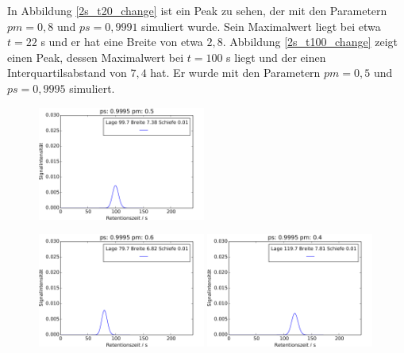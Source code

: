 In Abbildung \ref{2s_t20_change} ist ein Peak zu sehen, der mit den Parametern $pm = 0,8$ und $ps = 0,9991$ simuliert wurde. Sein Maximalwert liegt bei etwa $t = 22$ s und er hat eine Breite von etwa $2,8$. Abbildung \ref{2s_t100_change} zeigt einen Peak, dessen Maximalwert bei $t=100$ s liegt und der einen Interquartilsabstand von $7,4$ hat. Er wurde mit den Parametern $pm = 0,5$ und $ps = 0,9995$ simuliert.
\begin{figure}[h]
\begin{center}
\includegraphics[width=0.49\textwidth]{bilder/2s_einzeleinfluss/2s_t100}
\end{center}
\includegraphics[width=0.49\textwidth]{bilder/2s_einzeleinfluss/2s_t100_pmp}
\includegraphics[width=0.49\textwidth]{bilder/2s_einzeleinfluss/2s_t100_pmm}

\vspace*{5pt}


\end{figure}
